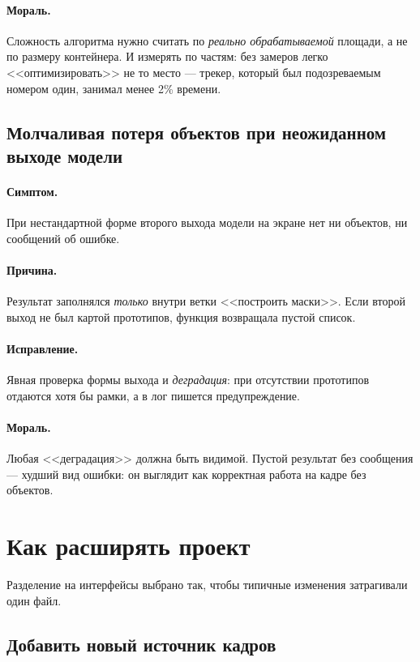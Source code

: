 \documentclass[11pt,a4paper]{article}
\theoremstyle{definition}
\theoremstyle{remark}
\begin{document}
\paragraph{Мораль.} Сложность алгоритма нужно считать по \emph{реально
обрабатываемой} площади, а не по размеру контейнера. И измерять по частям:
без замеров легко <<оптимизировать>> не то место --- трекер, который был
подозреваемым номером один, занимал менее 2\% времени.

\subsection{Молчаливая потеря объектов при неожиданном выходе модели}

\paragraph{Симптом.} При нестандартной форме второго выхода модели на экране
нет ни объектов, ни сообщений об ошибке.

\paragraph{Причина.} Результат заполнялся \emph{только} внутри ветки
<<построить маски>>. Если второй выход не был картой прототипов, функция
возвращала пустой список.

\paragraph{Исправление.} Явная проверка формы выхода и \emph{деградация}:
при отсутствии прототипов отдаются хотя бы рамки, а в лог пишется
предупреждение.

\paragraph{Мораль.} Любая <<деградация>> должна быть видимой. Пустой
результат без сообщения --- худший вид ошибки: он выглядит как корректная
работа на кадре без объектов.

\section{Как расширять проект}

Разделение на интерфейсы выбрано так, чтобы типичные изменения затрагивали
один файл.

\subsection{Добавить новый источник кадров}
\end{document}
